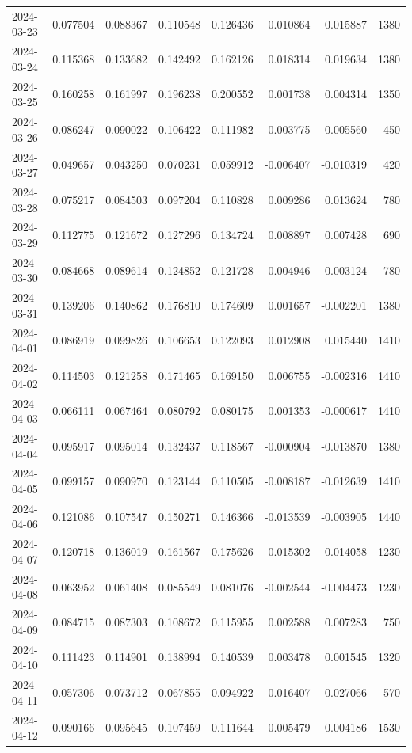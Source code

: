 \begin{tabular}{lrrrrrrr}
2024-03-23 & 0.077504 & 0.088367 & 0.110548 & 0.126436 & 0.010864 & 0.015887 & 1380 \\
2024-03-24 & 0.115368 & 0.133682 & 0.142492 & 0.162126 & 0.018314 & 0.019634 & 1380 \\
2024-03-25 & 0.160258 & 0.161997 & 0.196238 & 0.200552 & 0.001738 & 0.004314 & 1350 \\
2024-03-26 & 0.086247 & 0.090022 & 0.106422 & 0.111982 & 0.003775 & 0.005560 & 450 \\
2024-03-27 & 0.049657 & 0.043250 & 0.070231 & 0.059912 & -0.006407 & -0.010319 & 420 \\
2024-03-28 & 0.075217 & 0.084503 & 0.097204 & 0.110828 & 0.009286 & 0.013624 & 780 \\
2024-03-29 & 0.112775 & 0.121672 & 0.127296 & 0.134724 & 0.008897 & 0.007428 & 690 \\
2024-03-30 & 0.084668 & 0.089614 & 0.124852 & 0.121728 & 0.004946 & -0.003124 & 780 \\
2024-03-31 & 0.139206 & 0.140862 & 0.176810 & 0.174609 & 0.001657 & -0.002201 & 1380 \\
2024-04-01 & 0.086919 & 0.099826 & 0.106653 & 0.122093 & 0.012908 & 0.015440 & 1410 \\
2024-04-02 & 0.114503 & 0.121258 & 0.171465 & 0.169150 & 0.006755 & -0.002316 & 1410 \\
2024-04-03 & 0.066111 & 0.067464 & 0.080792 & 0.080175 & 0.001353 & -0.000617 & 1410 \\
2024-04-04 & 0.095917 & 0.095014 & 0.132437 & 0.118567 & -0.000904 & -0.013870 & 1380 \\
2024-04-05 & 0.099157 & 0.090970 & 0.123144 & 0.110505 & -0.008187 & -0.012639 & 1410 \\
2024-04-06 & 0.121086 & 0.107547 & 0.150271 & 0.146366 & -0.013539 & -0.003905 & 1440 \\
2024-04-07 & 0.120718 & 0.136019 & 0.161567 & 0.175626 & 0.015302 & 0.014058 & 1230 \\
2024-04-08 & 0.063952 & 0.061408 & 0.085549 & 0.081076 & -0.002544 & -0.004473 & 1230 \\
2024-04-09 & 0.084715 & 0.087303 & 0.108672 & 0.115955 & 0.002588 & 0.007283 & 750 \\
2024-04-10 & 0.111423 & 0.114901 & 0.138994 & 0.140539 & 0.003478 & 0.001545 & 1320 \\
2024-04-11 & 0.057306 & 0.073712 & 0.067855 & 0.094922 & 0.016407 & 0.027066 & 570 \\
2024-04-12 & 0.090166 & 0.095645 & 0.107459 & 0.111644 & 0.005479 & 0.004186 & 1530 \\

\end{tabular}
